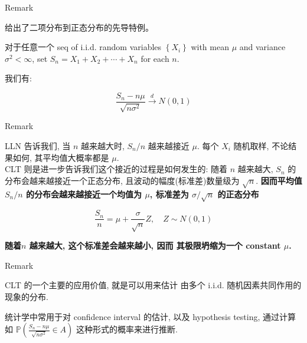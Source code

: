 \begin{qlremark}{Remark}

 给出了二项分布到正态分布的先导特例。

\end{qlremark}

\begin{theorem}{}

对于任意一个 seq of i.i.d. random variables \(\left\{ \mathit{X}_{\mathit{i}} \right\}\) with mean \(\mathit{\mu}\) and variance \(\mathit{\sigma}^{2} < \infty\), set \(\mathit{S}_{\mathit{n}} = \mathit{X}_{1} + \mathit{X}_{2} + \cdots + \mathit{X}_{\mathit{n}}\) for each \(\mathit{n}\).

我们有:

\[\frac{\mathit{S}_{\mathit{n}} - \mathit{n}\mathit{\mu}}{\sqrt{\mathit{n}\mathit{\sigma}^{2}}}\overset{\mathit{d}}{\rightarrow}\mathit{N}(0,1)\]

\end{theorem}

\begin{qlremark}{Remark}

LLN 告诉我们, 当 \(\mathit{n}\) 越来越大时, \(\mathit{S}_{\mathit{n}}/\mathit{n}\) 越来越接近 \(\mathit{\mu}\). 每个 \(\mathit{X}_{\mathit{i}}\) 随机取样, 不论结果如何, 其平均值大概率都是 \(\mathit{\mu}\).\\
CLT 则是进一步告诉我们这个接近的过程是如何发生的: 随着 \(\mathit{n}\) 越来越大, \(\mathit{S}_{\mathit{n}}\) 的分布会越来越接近一个正态分布, 且波动的幅度(标准差)数量级为 \(\sqrt{\mathit{n}}\). \textbf{因而平均值 \(\mathit{S}_{\mathit{n}}/\mathit{n}\) 的分布会越来越接近一个均值为 \(\mathit{\mu}\), 标准差为 \(\mathit{\sigma}/\sqrt{\mathit{n}}\) 的正态分布}

\[\frac{\mathit{S}_{\mathit{n}}}{\mathit{n}} = \mathit{\mu} + \frac{\mathit{\sigma}}{\sqrt{\mathit{n}}}\mathit{Z},\quad\mathit{Z} \sim \mathit{N}(0,1)\]

\textbf{随着\(\mathit{n}\) 越来越大, 这个标准差会越来越小, 因而 其极限坍缩为一个 constant \(\mathit{\mu}\).}\\

\end{qlremark}

\begin{qlremark}{Remark}

CLT 的一个主要的应用价值, 就是可以用来估计 由多个 i.i.d. 随机因素共同作用的现象的分布.

统计学中常用于对 confidence interval 的估计, 以及 hypothesis testing, 通过计算如 \(\mathbb{P}\left( {\frac{\mathit{S}_{\mathit{n}} - \mathit{n}\mathit{\mu}}{\sqrt{\mathit{n}\mathit{\sigma}^{2}}} \in \mathit{A}} \right)\) 这种形式的概率来进行推断.\\

\end{qlremark}

